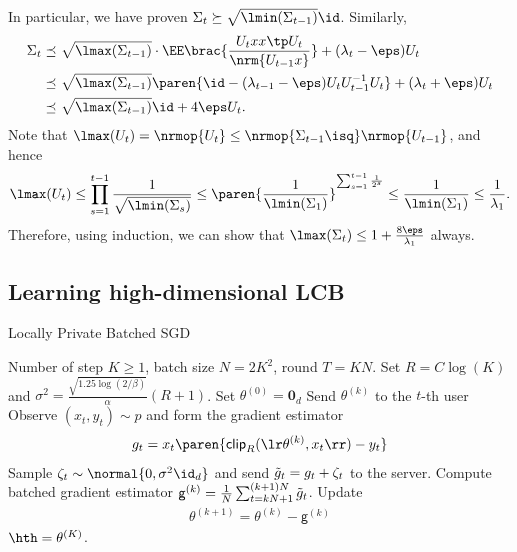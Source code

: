 In particular, we have proven $\Sigma_t\succeq \sqrt{ \lmin(\Sigma_{t-1}) }\id$. Similarly,
\begin{align*}
    \Sigma_t
    \preceq &~ \sqrt{ \lmax(\Sigma_{t-1}) }\cdot \EE\brac{ \frac{U_t xx\tp U_t}{\nrm{U_{t-1}x}} } +(\lambda_t-\eps) U_t \\
    \preceq &~ \sqrt{ \lmax(\Sigma_{t-1}) }\paren{ \id-(\lambda_{t-1}-\eps)U_tU_{t-1}^{-1}U_{t} } +(\lambda_t+\eps) U_t \\
    \preceq &~ \sqrt{ \lmax(\Sigma_{t-1}) }\id+4\eps U_t.
\end{align*}
Note that $\lmax(U_t)=\nrmop{U_t}\leq \nrmop{\Sigma_{t-1}\isq}\nrmop{U_{t-1}}$, and hence
\begin{align*}
    \lmax(U_t)\leq \prod_{s=1}^{t-1} \frac{1}{\sqrt{\lmin(\Sigma_s)}}
    \leq \paren{ \frac{1}{\lmin(\Sigma_1)} }^{\sum_{s=1}^{t-1}\frac{1}{2^s}}
    \leq \frac{1}{\lmin(\Sigma_1)}\leq \frac{1}{\lambda_1}.
\end{align*}
Therefore, using induction, we can show that $\lmax(\Sigma_t)\leq 1+\frac{8\eps}{\lambda_1}$ always.

\subsection{Learning high-dimensional LCB}

\newcommand{\pa}[1]{\theta^{(#1)}}
\newcommand{\gd}[1]{\mathsf{g}^{(#1)}}
\newcommand{\ogd}[1]{\bar{\mathsf{g}}^{(#1)}}
\newcommand{\xt}{x_t}
\newcommand{\yt}{y_t}
\newcommand{\clip}{\mathsf{clip}}
\newcommand{\nt}{\zeta_t}
\newcommand{\gt}{g_t}
\newcommand{\tgt}{\Tilde{g}_t}
\newcommand{\avgtk}{\frac1N\sum_{t=kN+1}^{(k+1)N}}
\begin{algorithm}[t]
\caption{Locally Private Batched SGD}\label{alg:LR-SGD}
\begin{algorithmic}[1]
\REQUIRE Number of step $K\geq 1$, batch size $N=2K^2$, round $T=KN$.
\STATE Set $R=C\log(K)$ and $\sigma^2=\frac{\sqrt{1.25\log(2/\beta)}}{\alpha}(R+1)$.
\STATE Set $\pa{0}=\mathbf{0}_d$
        \STATE Send $\pa{k}$ to the $t$-th user
        \STATE Observe $(\xt,\yt)\sim p$ and form the gradient estimator
        \begin{align*}
            g_t=\xt\paren{ \clip_R(\lr \pa{k},\xt \rr)-\yt }
        \end{align*}
        \STATE Sample $\nt\sim \normal{0,\sigma^2\id_d}$ and send $\tgt=\gt+\nt$ to the server.    
    \ENDFOR
    \STATE Compute batched gradient estimator $\gd{k}=\avgtk \tgt$.
    \STATE Update
    \begin{align*}
        \pa{k+1}=\pa{k}-\gd{k}
    \end{align*}
\ENDFOR
\ENSURE $\hth=\pa{K}$.
\end{algorithmic}
\end{algorithm}

